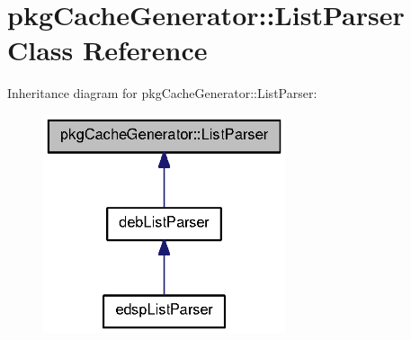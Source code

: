 \section{pkg\-Cache\-Generator\-:\-:\-List\-Parser \-Class \-Reference}
\label{classpkgCacheGenerator_1_1ListParser}


\-Inheritance diagram for pkg\-Cache\-Generator\-:\-:\-List\-Parser\-:
\nopagebreak
\begin{figure}[H]
\begin{center}
\leavevmode
\includegraphics[width=202pt]{classpkgCacheGenerator_1_1ListParser__inherit__graph}
\end{center}
\end{figure}
